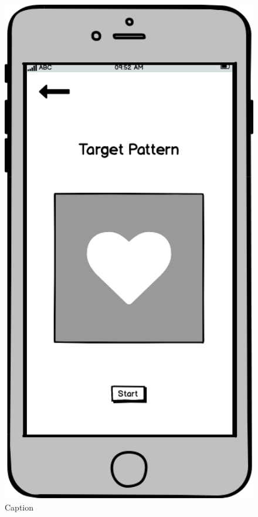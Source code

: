 \documentclass[11pt]{article}
\begin{document}
           \begin{figure}
                \begin{minipage}[c]{0.35\textwidth}
                \includegraphics[width=1\textwidth]{Images/Prototype/prototypeTarget.png}
                \end{minipage}\hfill
                \begin{minipage}[c]{0.65\textwidth}
                \caption{Caption}
                \label{fig:target}
                \end{minipage}
            \end{figure}
                           
\end{document}
